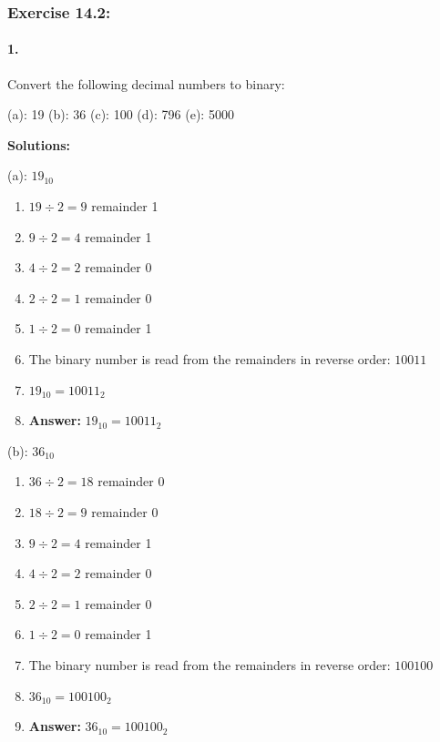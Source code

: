 \documentclass{article}
\begin{document}
\subsubsection*{Exercise 14.2:} 
\vspace*{0.25cm}

\paragraph*{1.}
Convert the following decimal numbers to binary:

\vspace*{0.25cm}
(a): 19 (b): 36 (c): 100 (d): 796 (e): 5000

\vspace*{0.5cm}

\noindent \textbf{Solutions:}

\vspace*{0.25cm}

\noindent (a): $19_{10}$

\begin{enumerate}
    \item $19 \div 2 = 9$ remainder 1
    \item $9 \div 2 = 4$ remainder 1
    \item $4 \div 2 = 2$ remainder 0
    \item $2 \div 2 = 1$ remainder 0
    \item $1 \div 2 = 0$ remainder 1
    \item The binary number is read from the remainders in reverse order: $10011$
    \item $19_{10} = 10011_2$
    \item \textbf{Answer:} $19_{10} = 10011_2$
\end{enumerate}

\vspace*{0.5cm}

\noindent (b): $36_{10}$

\begin{enumerate}
    \item $36 \div 2 = 18$ remainder 0
    \item $18 \div 2 = 9$ remainder 0
    \item $9 \div 2 = 4$ remainder 1
    \item $4 \div 2 = 2$ remainder 0
    \item $2 \div 2 = 1$ remainder 0
    \item $1 \div 2 = 0$ remainder 1
    \item The binary number is read from the remainders in reverse order: $100100$
    \item $36_{10} = 100100_2$
    \item \textbf{Answer:} $36_{10} = 100100_2$
\end{enumerate}
\end{document}
